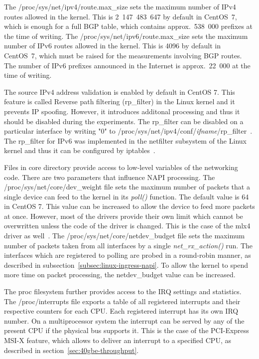 The /proc/sys/net/ipv4/route.max\_size sets the maximum number of IPv4 routes allowed in the kernel.
This is 2~147~483~647 by default in CentOS~7, which is enough for a full BGP table,
which contains approx.~538~000 prefixes at the time of writing. %
The /proc/sys/net/ipv6/route.max\_size sets the maximum number of IPv6 routes allowed in the kernel.
This is 4096 by default in CentOS~7, which must be raised for the measurements involving BGP routes.
The number of IPv6 prefixes announced in the Internet is approx.~22~000 at the time of writing. %

The source IPv4 address validation is enabled by default in CentOS 7.
This feature is called Reverse path filtering (rp\_filter) in the Linux kernel and it prevents IP spoofing.
However, it introduces additonal processing and thus it should be disabled during the experiments.
The rp\_filter can be disabled on a particular interface
by writing "0" to /proc/sys/net/ipv4/conf/{\it{ifname}}/rp\_filter~\cite{kernel-doc-ip-sysctl}.
The rp\_filter for IPv6 was implemented in the netfilter subsystem of the Linux kernel and
thus it can be configured by iptables~\cite{kernel-source}.

Files in core directory provide access to low-level variables of the networking code.
There are two parameters that influence NAPI processing.
The /proc/sys/net/core/dev\_weight file sets the maximum number of packets that a single device
can feed to the kernel in its {\it{poll()}} function.
The default value is 64 in CentOS 7.
This value can be increased to allow the device to feed more packets at once.
However, most of the drivers provide their own limit which cannot be overwritten unless the code of the driver is changed.
This is the case of the mlx4 driver as well~\cite{kernel-source}.
The /proc/sys/net/core/netdev\_budget file sets the
maximum number of packets taken from all interfaces by a single {\it{net\_rx\_action()}} run.
The interfaces which are registered to polling are
probed in a round-robin manner, as described in subsection~\ref{subsec:linux-ingress-napi}.
To allow the kernel to spend more time on packet processing, the netdev\_budget value can be increased.

The proc filesystem further provides access to the IRQ settings and statistics.
The /proc/interrupts file exports a table of all registered interrupts and their respective counters for each CPU.
Each registered interrupt has its own IRQ number.
On a multiprocessor system the interrupt can be served by any of the present CPU if the physical bus supports it.
This is the case of the PCI-Express MSI-X feature, which allows to deliver an interrupt to a specified CPU,
as described in section~\ref{sec:40gbe-throughput}.

